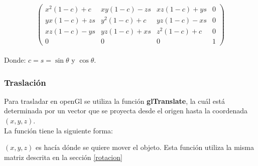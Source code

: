 \documentclass[12pt,journal,compsoc]{IEEEtran}
\begin{document}
\[
	\left( 
		\begin{array}{cccc}
			x^{2}(1-c)+c & xy(1-c)-zs & xz(1-c)+ys & 0 \\
			yx(1-c)+zs & y^{2}(1-c)+c & yz(1-c)-xs & 0 \\
			xz(1-c)-ys & yz(1-c)+xs & z^{2}(1-c)+c & 0 \\
			0 & 0 & 0 & 1
		\end{array}
	\right)
\]\\

Donde: $c = s=\sin\theta$ y $\cos\theta$.
\subsubsection{Traslación}
Para trasladar en openGl se utiliza la función \textbf{glTranslate}, la cuál está determinada por un vector que se proyecta desde el origen hasta la coordenada $(x,y,z)$.\\La función tiene la siguiente forma:
%
 
%
$(x,y,z)$ es hacía dónde se quiere mover el objeto. Esta función utiliza la misma matriz descrita en la sección \ref{rotacion}
\end{document}
